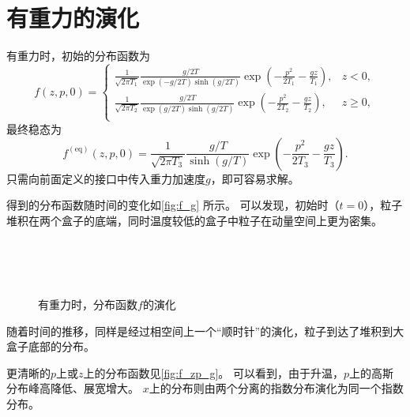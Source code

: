 \documentclass[a4paper,unicode]{report}
\begin{document}
\section{有重力的演化}
有重力时，初始的分布函数为
\begin{equation}
    f(z, p, 0) = \begin{cases}
        \frac{1}{\sqrt{2\pi T_1}}\frac{g/2T}{\exp(-g/2T)\sinh(g/2T)} \exp(-\frac{p^2}{2T_1}-\frac{gz}{T_1}), & z < 0,\\
        \frac{1}{\sqrt{2\pi T_2}}\frac{g/2T}{\exp(g/2T)\sinh(g/2T)} \exp(-\frac{p^2}{2T_2}-\frac{gz}{T_2}), & z \ge 0,\\
    \end{cases}
\end{equation}
最终稳态为
\begin{equation}
    f^{(\text{eq})}(z, p, 0) =
        \frac{1}{\sqrt{2\pi T_3}}
        \frac{g/T}{\sinh(g/T)}
        \exp(-\frac{p^2}{2T_3}-\frac{gz}{T_3}).
\end{equation}
只需向前面定义的接口中传入重力加速度$g$，即可容易求解。

得到的分布函数随时间的变化如\autoref{fig:f_g} 所示。
可以发现，初始时（$t=0$），粒子堆积在两个盒子的底端，同时温度较低的盒子中粒子在动量空间上更为密集。

\begin{figure}
    \centering
    \\
    \\
    \\
    \caption{有重力时，分布函数$f$的演化}
    \label{fig:f_g}
\end{figure}

随着时间的推移，同样是经过相空间上一个“顺时针”的演化，粒子到达了堆积到大盒子底部的分布。

更清晰的$p$上或$z$上的分布函数见\autoref{fig:f_zp_g}。
可以看到，由于升温，$p$上的高斯分布峰高降低、展宽增大。
$x$上的分布则由两个分离的指数分布演化为同一个指数分布。
\end{document}

